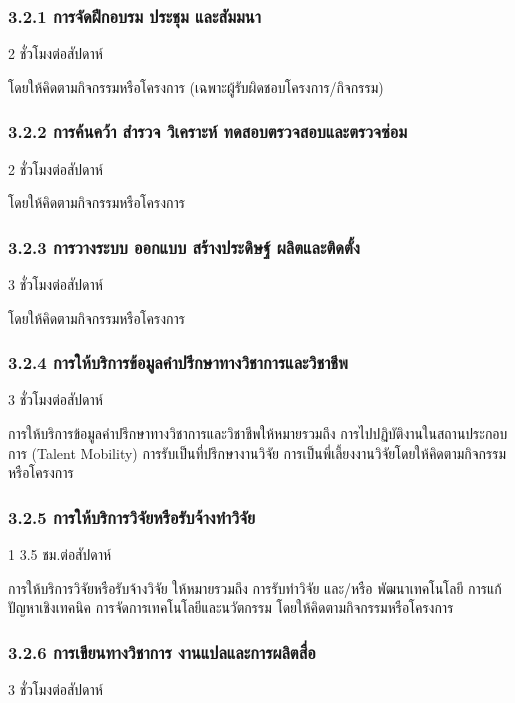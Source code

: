 \documentclass[a4paper,12pt,english]{sphinxmanual}
\begin{document}
\subsubsection{3.2.1  การจัดฝึกอบรม ประชุม และสัมมนา}
\label{\detokenize{workload_rubric:id63}}
2 ชั่วโมงต่อสัปดาห์

โดยให้คิดตามกิจกรรมหรือโครงการ (เฉพาะผู้รับผิดชอบโครงการ/กิจกรรม)


\subsubsection{3.2.2  การค้นคว้า สำรวจ วิเคราะห์ ทดสอบตรวจสอบและตรวจซ่อม}
\label{\detokenize{workload_rubric:id64}}
2 ชั่วโมงต่อสัปดาห์

โดยให้คิดตามกิจกรรมหรือโครงการ


\subsubsection{3.2.3 การวางระบบ ออกแบบ สร้างประดิษฐ์ ผลิตและติดตั้ง}
\label{\detokenize{workload_rubric:id65}}
3 ชั่วโมงต่อสัปดาห์

โดยให้คิดตามกิจกรรมหรือโครงการ


\subsubsection{3.2.4  การให้บริการข้อมูลคำปรึกษาทางวิชาการและวิชาชีพ}
\label{\detokenize{workload_rubric:id66}}
3 ชั่วโมงต่อสัปดาห์

การให้บริการข้อมูลคำปรึกษาทางวิชาการและวิชาชีพให้หมายรวมถึง การไปปฏิบัติงานในสถานประกอบการ (Talent Mobility) การรับเป็นที่ปรึกษางานวิจัย การเป็นพี่เลี้ยงงานวิจัยโดยให้คิดตามกิจกรรมหรือโครงการ


\subsubsection{3.2.5  การให้บริการวิจัยหรือรับจ้างทำวิจัย}
\label{\detokenize{workload_rubric:id67}}
1 \sphinxhyphen{} 3.5  ชม.ต่อสัปดาห์

การให้บริการวิจัยหรือรับจ้างวิจัย ให้หมายรวมถึง การรับทำวิจัย และ/หรือ พัฒนาเทคโนโลยี การแก้ปัญหาเชิงเทคนิค การจัดการเทคโนโลยีและนวัตกรรม
โดยให้คิดตามกิจกรรมหรือโครงการ


\subsubsection{3.2.6  การเขียนทางวิชาการ งานแปลและการผลิตสื่อ}
\label{\detokenize{workload_rubric:id68}}
3 ชั่วโมงต่อสัปดาห์
\end{document}
